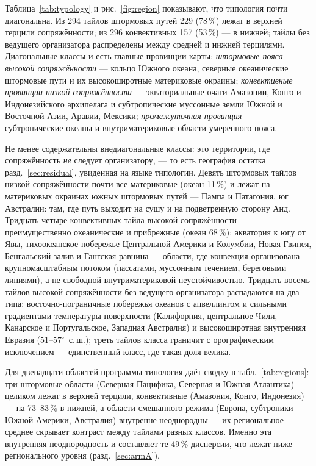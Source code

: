 \documentclass[11pt,a4paper]{article}
\begin{document}
Таблица~\ref{tab:typology} и рис.~\ref{fig:region} показывают, что типология почти диагональна. Из 294 тайлов штормовых путей 229 (78\,\%) лежат в верхней терцили сопряжённости; из 296 конвективных 157 (53\,\%) --- в нижней; тайлы без ведущего организатора распределены между средней и нижней терцилями. Диагональные классы и есть главные провинции карты: \emph{штормовые пояса высокой сопряжённости} --- кольцо Южного океана, северные океанические штормовые пути и их высокоширотные материковые окраины; \emph{конвективные провинции низкой сопряжённости} --- экваториальные очаги Амазонии, Конго и Индонезийского архипелага и субтропические муссонные земли Южной и Восточной Азии, Аравии, Мексики; \emph{промежуточная провинция} --- субтропические океаны и внутриматериковые области умеренного пояса.

Не менее содержательны внедиагональные классы: это территории, где сопряжённость \emph{не} следует организатору, --- то есть география остатка разд.~\ref{sec:residual}, увиденная на языке типологии. Девять штормовых тайлов низкой сопряжённости почти все материковые (океан 11\,\%) и лежат на материковых окраинах южных штормовых путей --- Пампа и Патагония, юг Австралии: там, где путь выходит на сушу и на подветренную сторону Анд. Тридцать четыре конвективных тайла высокой сопряжённости --- преимущественно океанические и прибрежные (океан 68\,\%): акватория к югу от Явы, тихоокеанское побережье Центральной Америки и Колумбии, Новая Гвинея, Бенгальский залив и Гангская равнина --- области, где конвекция организована крупномасштабным потоком (пассатами, муссонным течением, береговыми линиями), а не свободной внутриматериковой неустойчивостью. Тридцать восемь тайлов высокой сопряжённости без ведущего организатора распадаются на два типа: восточно-пограничные побережья океанов с апвеллингом и сильными градиентами температуры поверхности (Калифорния, центральное Чили, Канарское и Португальское, Западная Австралия) и высокоширотная внутренняя Евразия ($51$--$57^\circ$~с.\,ш.); треть тайлов класса граничит с орографическим исключением --- единственный класс, где такая доля велика.

Для двенадцати областей программы типология даёт сводку в табл.~\ref{tab:regions}: три штормовые области (Северная Пацифика, Северная и Южная Атлантика) целиком лежат в верхней терцили, конвективные (Амазония, Конго, Индонезия) --- на 73--83\,\% в нижней, а области смешанного режима (Европа, субтропики Южной Америки, Австралия) внутренне неоднородны --- их региональное среднее скрывает контраст между тайлами разных классов. Именно эта внутренняя неоднородность и составляет те 49\,\% дисперсии, что лежат ниже регионального уровня (разд.~\ref{sec:armA}).
\end{document}

